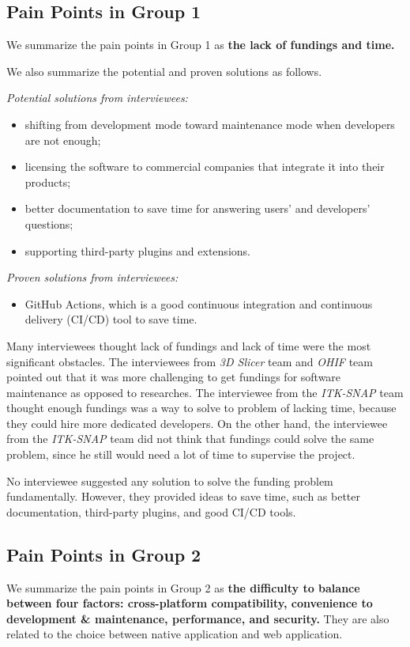 \subsection{Pain Points in Group 1}
\label{sec_pain_points_1}
We summarize the pain points in Group 1 as
\textbf{the lack of fundings and time.}

We also summarize the potential and proven solutions as follows.

\textit{Potential solutions from interviewees:}
\begin{itemize}
\item shifting from development mode toward maintenance mode when developers are not enough;
\item licensing the software to commercial companies that integrate it into their products;
\item better documentation to save time for answering users' and developers' questions;
\item supporting third-party plugins and extensions.
\end{itemize}

\textit{Proven solutions from interviewees:}
\begin{itemize}
\item GitHub Actions, which is a good continuous integration and continuous delivery (CI/CD) tool to save time.
\end{itemize}

Many interviewees thought lack of fundings and lack of time were the most significant obstacles. The interviewees from \textit{3D Slicer} team and \textit{OHIF} team pointed out that it was more challenging to get fundings for software maintenance as opposed to researches. The interviewee from the \textit{ITK-SNAP} team thought enough fundings was a way to solve to problem of lacking time, because they could hire more dedicated developers. On the other hand, the interviewee from the \textit{ITK-SNAP} team did not think that fundings could solve the same problem, since he still would need a lot of time to supervise the project.

No interviewee suggested any solution to solve the funding problem fundamentally. However, they provided ideas to save time, such as better documentation, third-party plugins, and good CI/CD tools.

\subsection{Pain Points in Group 2}
\label{sec_pain_points_2}
\label{sec_pain_points_1}
We summarize the pain points in Group 2 as
\textbf{the difficulty to balance between four factors: cross-platform compatibility, convenience to development \& maintenance, performance, and security.} They are also related to the choice between native application and web application.

